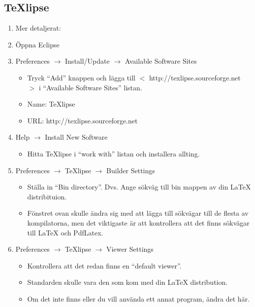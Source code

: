 \documentclass[11pt]{amsart}
\begin{document}
\subsection{TeXlipse}
\begin{enumerate}

\item[] Mer detaljerat: {} \\

\item \"{O}ppna Eclipse  

\item Preferences $\rightarrow$ Install/Update $\rightarrow$ Available Software Sites
	\begin{itemize}
	\item Tryck ``Add'' knappen och l\"{a}gga till $<$ http://texlipse.sourceforge.net $>$ i ``Available Software Sites'' listan. 
	\item Name: TeXlipse 
	\item URL: http://texlipse.sourceforge.net
	\end{itemize}

\item Help $\rightarrow$ Install New Software
	\begin{itemize}
	\item Hitta TeXlipse i ``work with'' listan och installera allting.
	\end{itemize}
	
\item Preferences $\rightarrow$ TeXlipse $\rightarrow$ Builder Settings
	\begin{itemize}
	\item St\"{a}lla in ``Bin directory''. Dvs. Ange s\"{o}kv\"{a}g till bin mappen av din LaTeX distribituion. 
	\item F\"{o}nstret ovan skulle \"{a}ndra sig med att l\"{a}gga till s\"{o}kv\"{a}gar till de flesta av kompilatorna, men det viktigaste \"{a}r att kontrollera att det finns s\"{o}kv\"{a}gar till LaTeX och PdfLatex. 
	\end{itemize}
	
\item Preferences $\rightarrow$ TeXlipse $\rightarrow$ Viewer Settings
	\begin{itemize}
	\item Kontrollera att det redan finns en ``default viewer''.
	\item Standarden skulle vara den som kom med din LaTeX distribution.
	\item Om det inte finns eller du vill anv\"{a}nda ett annat program, \"{a}ndra det h\"{a}r.
	\end{itemize}

\end{enumerate}
\end{document}
